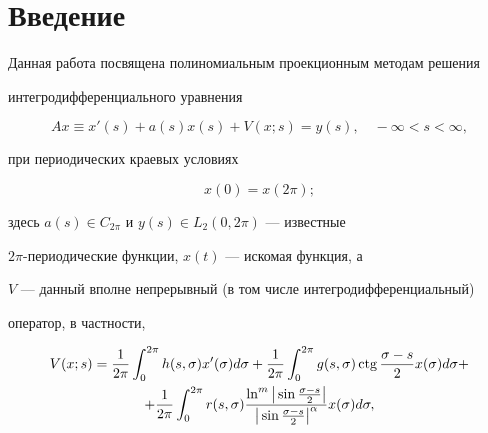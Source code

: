\date{}




\pagestyle{plain} %







\maketitle


\label{begin}





\section*{Введение}





Данная работа посвящена полиномиальным проекционным методам решения


интегродифференциального уравнения


\begin{equation}


Ax\equiv x'(s)+ a(s) x(s) + V(x;s) =y(s),


\quad -\infty <s<\infty ,\tag{0.1}


\end{equation}


при периодических краевых условиях


\begin{equation}


x(0)=x(2\pi ); \tag{0.2}


\end{equation}


здесь $a(s)\in C_{2\pi}$ и $y(s)\in L_2(0,2\pi )$ --- известные


$2\pi$-периодические функции, $x(t)$ --- искомая функция, а


$V$ --- данный вполне непрерывный (в том числе интегродифференциальный)


оператор, в частности,


\begin{multline*}


V(x;s)=\frac{1}{2\pi}\int_0^{2\pi}h(s,\sigma)x'(\sigma) d\sigma +


\frac{1}{2\pi}\int_0^{2\pi}g(s,\sigma)\ctg


\frac{\sigma -s}{2}x(\sigma) d\sigma + \\


%


+\frac{1}{2\pi}\int_0^{2\pi}r(s,\sigma)


\frac{\ln ^m\big|\sin\frac{\sigma -s}


{2}\big|}{\big| \sin\frac{\sigma -s}{2}\big|^\alpha }x(\sigma ) d\sigma,


\end{multline*}


